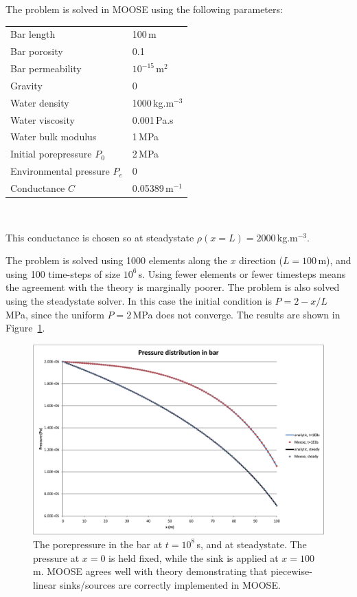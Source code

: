 \documentclass[]{scrreprt}
\begin{document}
\noindent The problem is solved in MOOSE using the following parameters:
\begin{center}
\begin{tabular}{|ll|}
\hline
Bar length & 100\,m \\
Bar porosity & 0.1 \\
Bar permeability & $10^{-15}$\,m$^{2}$ \\
\hline
Gravity & 0 \\
\hline
Water density & 1000\,kg.m$^{-3}$ \\
Water viscosity & 0.001\,Pa.s \\
Water bulk modulus & 1\,MPa \\
\hline
Initial porepressure $P_{0}$ & 2\,MPa \\
Environmental pressure $P_{e}$ & 0 \\
\hline
Conductance $C$ & 0.05389\,m$^{-1}$ \\
\hline
\end{tabular} \\
\end{center}
This conductance is chosen so at steadystate $\rho(x=L)=2000$\,kg.m$^{-3}$.

The problem is solved using 1000 elements along the $x$
direction ($L=100$\,m), and using 100 time-steps of size $10^6$\,s.
Using fewer elements or fewer timesteps means the agreement with the
theory is marginally poorer.  The problem is also solved using the
steadystate solver.  In this case the initial condition is
$P=2-x/L$\,MPa, since the uniform $P=2$\,MPa does not converge.  The
results are shown in Figure~\ref{nc.fig}.

\begin{figure}[htb]
\begin{center}
\includegraphics[width=17cm]{nc.eps}
\caption{The porepressure in the bar at $t=10^{8}$\,s, and at
  steadystate.  The pressure at $x=0$ is held fixed, while the sink is
  applied at $x=100$\,m.  MOOSE agrees well with theory demonstrating
  that piecewise-linear sinks/sources are correctly implemented in MOOSE.}
\label{nc.fig}
\end{center}
\end{figure}
\end{document}
